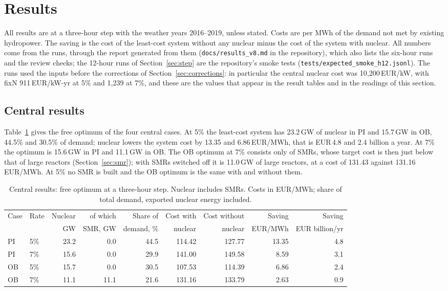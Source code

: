 \section{Results}\label{sec:results}
All results are at a three-hour step with the weather years 2016--2019, unless stated. Costs are per MWh of the demand not met by existing hydropower. The saving is the cost of the least-cost system without any nuclear minus the cost of the system with nuclear. All numbers come from the runs, through the report generated from them (\texttt{docs/results\_v8.md} in the repository), which also lists the six-hour runs and the review checks; the 12-hour runs of Section~\ref{sec:step} are the repository's smoke tests (\texttt{tests/expected\_smoke\_h12.jsonl}). The runs used the inputs before the corrections of Section~\ref{sec:corrections}: in particular the central nuclear cost was 10{,}200\,EUR/kW, with fixN 911\,EUR/kW-yr at 5\% and 1{,}239 at 7\%, and these are the values that appear in the result tables and in the readings of this section.

\subsection{Central results}\label{sec:central}
Table~\ref{tab:central} gives the free optimum of the four central cases. At 5\% the least-cost system has 23.2\,GW of nuclear in PI and 15.7\,GW in OB, 44.5\% and 30.5\% of demand; nuclear lowers the system cost by 13.35 and 6.86\,EUR/MWh, that is EUR\,4.8 and 2.4 billion a year. At 7\% the optimum is 15.6\,GW in PI and 11.1\,GW in OB. The OB optimum at 7\% consists only of SMRs, whose target cost is then just below that of large reactors (Section~\ref{sec:smr}); with SMRs switched off it is 11.0\,GW of large reactors, at a cost of 131.43 against 131.16\,EUR/MWh. At 5\% no SMR is built and the OB optimum is the same with and without them.

\begin{table}[!tb]
\centering\footnotesize
\caption{Central results: free optimum at a three-hour step. Nuclear includes SMRs. Costs in EUR/MWh; share of total demand, exported nuclear energy included.}\label{tab:central}
\begin{tabular}{@{}llrrrrrrr@{}}
\toprule
Case & Rate & Nuclear & of which & Share of & Cost with & Cost without & Saving & Saving\\
 & & GW & SMR, GW & demand, \% & nuclear & nuclear & EUR/MWh & EUR billion/yr\\
\midrule
PI & 5\% & 23.2 & 0.0 & 44.5 & 114.42 & 127.77 & 13.35 & 4.8\\
PI & 7\% & 15.6 & 0.0 & 29.9 & 141.00 & 149.58 & 8.59 & 3.1\\
OB & 5\% & 15.7 & 0.0 & 30.5 & 107.53 & 114.39 & 6.86 & 2.4\\
OB & 7\% & 11.1 & 11.1 & 21.6 & 131.16 & 133.79 & 2.63 & 0.9\\
\bottomrule
\end{tabular}
\end{table}

